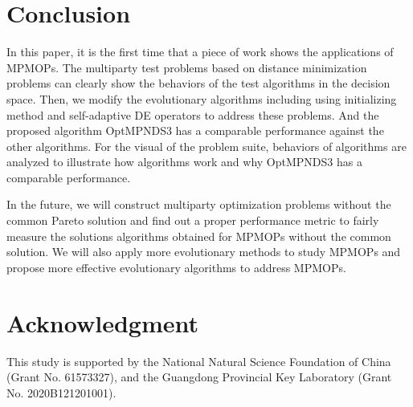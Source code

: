 \documentclass[preprint,12pt]{elsarticle}
\begin{document}
\section{Conclusion}\label{sec:conclusion}

In this paper, it is the first time that a piece of work shows the applications of MPMOPs.
The multiparty test problems based on distance minimization problems can clearly show the behaviors of the test algorithms in the decision space.
Then, we modify the evolutionary algorithms including using initializing method and self-adaptive DE operators to address these problems.
And the proposed algorithm OptMPNDS3 has a comparable performance against the other algorithms.
For the visual of the problem suite, behaviors of algorithms are analyzed to illustrate how algorithms work and why OptMPNDS3 has a comparable performance.

In the future, we will construct multiparty optimization problems without the common Pareto solution and find out a proper performance metric to fairly measure the solutions algorithms obtained for MPMOPs without the common solution.
We will also apply more evolutionary methods to study MPMOPs and propose more effective evolutionary algorithms  to address MPMOPs.


%
\section* {Acknowledgment}

This study is supported by the National Natural Science Foundation of China (Grant No. 61573327), and the Guangdong Provincial Key Laboratory (Grant No. 2020B121201001).













\end{document}
